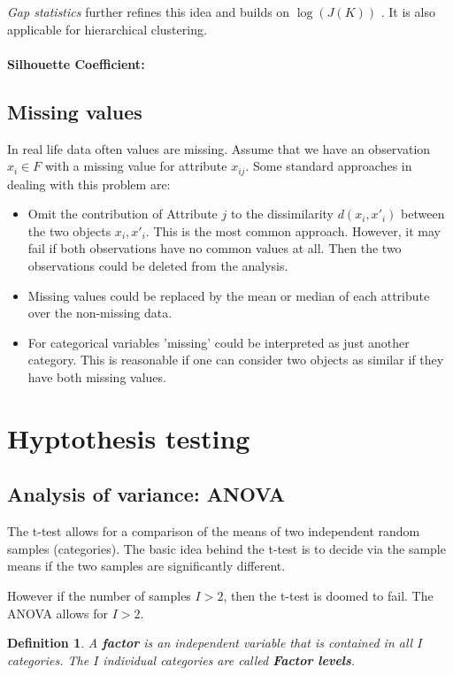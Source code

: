\documentclass[10pt,a4paper]{article}
\newtheorem{definition}{Definition}
\begin{document}
\textit{Gap statistics} further refines this idea and builds on $\log(J(K))$ \cite{tibshirani_gap_statistics}. It is also applicable for hierarchical clustering.

\paragraph{Silhouette Coefficient:}

\subsection{Missing values}
In real life data often values are missing. Assume that we have an observation $x_i \in F$ with a missing value for attribute $x_{ij}$.  Some standard approaches in dealing with this problem are: \cite{hastie_element}
\begin{itemize}
\item Omit the contribution of Attribute $j$ to the dissimilarity  $d(x_i,x'_i)$ between the two objects $x_i, x'_i$. This is the most common approach. However, it may fail if both observations have no common values at all. Then the two observations could be deleted from the analysis.
\item Missing values could be replaced by the mean or median of each attribute over the non-missing data.
\item For categorical variables 'missing' could be interpreted as just another category. This is reasonable if one can consider two objects as similar if they have both missing values.
\end{itemize}

\section{Hyptothesis testing}
\subsection{Analysis of variance: ANOVA}
The t-test allows for a comparison of the means of two independent random samples (categories). The basic idea behind the t-test is to decide via the sample means if the two samples are significantly different. 

However if the number of samples $I>2$, then the t-test is doomed to fail.  
The ANOVA allows for $I>2$.
\begin{definition}
A \textbf{factor} is an independent variable that is contained in all $I$ categories. The $I$ individual categories are called \textbf{Factor levels}.
 
\end{definition}
\end{document}
